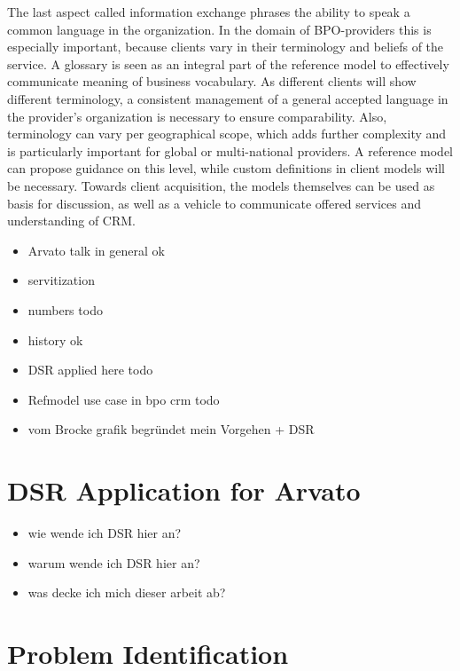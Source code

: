 The last aspect called information exchange phrases the ability to speak a common language in the organization. In the domain of BPO-providers this is especially important, because clients vary in their terminology and beliefs of the service. A glossary is seen as an integral part of the reference model to effectively communicate meaning of business vocabulary. As different clients will show different terminology, a consistent management of a general accepted language in the provider’s organization is necessary to ensure comparability. Also, terminology can vary per geographical scope, which adds further complexity and is particularly important for global or multi-national providers. A reference model can propose guidance on this level, while custom definitions in client models will be necessary. Towards client acquisition, the models themselves can be used as basis for discussion, as well as a vehicle to communicate offered services and understanding of CRM.
%

\begin{itemize}
	\item Arvato talk in general ok
	\item servitization
	\item numbers todo
	\item history ok
	\item DSR applied here todo
	\item Refmodel use case in bpo crm todo
	\item vom Brocke grafik begründet mein Vorgehen + DSR
\end{itemize}
\section{DSR Application for Arvato}

\begin{itemize}
	\item wie wende ich DSR hier an?
	\item warum wende ich DSR hier an?
	\item was decke ich mich dieser arbeit ab?
	
	
\end{itemize}
\section{Problem Identification}

